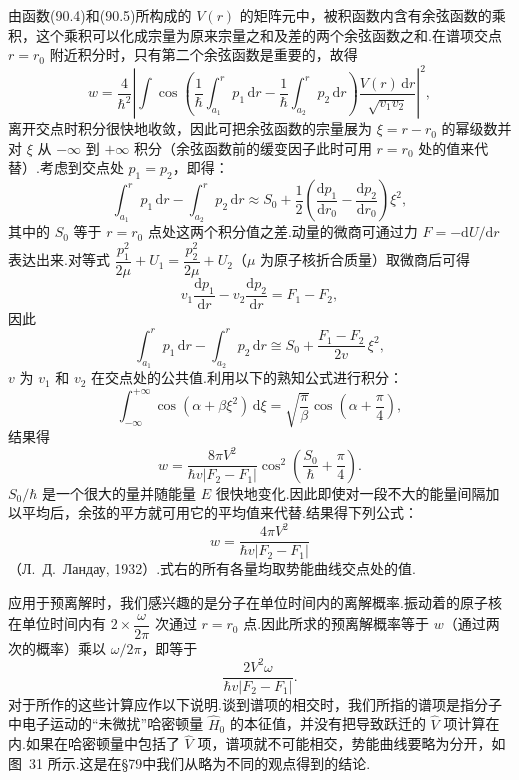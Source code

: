 由函数(90.4)和(90.5)所构成的 $V(r)$ 的矩阵元中，被积函数内含有余弦函数的乘积，这个乘积可以化成宗量为原来宗量之和及差的两个余弦函数之和.在谱项交点 $r=r_0$ 附近积分时，只有第二个余弦函数是重要的，故得
\begin{equation*}
  w=\frac{4}{\hbar^2}\left|\int\cos\left(\frac{1}{\hbar}\int_{a_1}^r p_1\,\mathrm{d}r
  -\frac{1}{\hbar}\int_{a_2}^r p_2\,\mathrm{d}r\right)
  \frac{V(r)\,\mathrm{d}r}{\sqrt{v_1v_2}}\right|^2,
\end{equation*}
离开交点时积分很快地收敛，因此可把余弦函数的宗量展为 $\xi=r-r_0$ 的幂级数并对 $\xi$ 从 $-\infty$ 到 $+\infty$ 积分（余弦函数前的缓变因子此时可用 $r=r_0$ 处的值来代替）.考虑到交点处 $p_1=p_2$，即得：
\begin{equation*}
  \int_{a_1}^r p_1\,\mathrm{d}r-\int_{a_2}^r p_2\,\mathrm{d}r
  \approx S_0+\frac{1}{2}\left(\frac{\mathrm{d}p_1}{\mathrm{d}r_0}
  -\frac{\mathrm{d}p_2}{\mathrm{d}r_0}\right)\xi^2,
\end{equation*}
其中的 $S_0$ 等于 $r=r_0$ 点处这两个积分值之差.动量的微商可通过力 $F=-\mathrm{d}U/\mathrm{d}r$ 表达出来.对等式
$\dfrac{p_1^2}{2\mu}+U_1=\dfrac{p_2^2}{2\mu}+U_2$（$\mu$ 为原子核折合质量）取微商后可得
\begin{equation*}
  v_1\frac{\mathrm{d}p_1}{\mathrm{d}r}-v_2\frac{\mathrm{d}p_2}{\mathrm{d}r}=F_1-F_2,
\end{equation*}
因此
\begin{equation*}
  \int_{a_1}^r p_1\,\mathrm{d}r-\int_{a_2}^r p_2\,\mathrm{d}r
  \cong S_0+\frac{F_1-F_2}{2v}\,\xi^2,
\end{equation*}
$v$ 为 $v_1$ 和 $v_2$ 在交点处的公共值.利用以下的熟知公式进行积分：
\begin{equation*}
  \int_{-\infty}^{+\infty}\cos(\alpha+\beta\xi^2)\,\mathrm{d}\xi
  =\sqrt{\frac{\pi}{\beta}}\cos\left(\alpha+\frac{\pi}{4}\right),
\end{equation*}
结果得
\begin{equation}
  w=\frac{8\pi V^2}{\hbar v|F_2-F_1|}
  \cos^2\left(\frac{S_0}{\hbar}+\frac{\pi}{4}\right).
\end{equation}
$S_0/\hbar$ 是一个很大的量并随能量 $E$ 很快地变化.因此即使对一段不大的能量间隔加以平均后，余弦的平方就可用它的平均值来代替.结果得下列公式：
\begin{equation}
  w=\frac{4\pi V^2}{\hbar v|F_2-F_1|}
\end{equation}
（Л.~Д.~Ландау, 1932）.式右的所有各量均取势能曲线交点处的值.

应用于预离解时，我们感兴趣的是分子在单位时间内的离解概率.振动着的原子核在单位时间内有 $2\times\dfrac{\omega}{2\pi}$ 次通过 $r=r_0$ 点.因此所求的预离解概率等于 $w$（通过两次的概率）乘以 $\omega/2\pi$，即等于
\begin{equation}
  \frac{2V^2\omega}{\hbar v|F_2-F_1|}.
\end{equation}
对于所作的这些计算应作以下说明.谈到谱项的相交时，我们所指的谱项是指分子中电子运动的“未微扰”哈密顿量 $\hat{H}_0$ 的本征值，并没有把导致跃迁的 $\hat{V}$ 项计算在内.如果在哈密顿量中包括了 $\hat{V}$ 项，谱项就不可能相交，势能曲线要略为分开，如图~31 所示.这是在§79中我们从略为不同的观点得到的结论.

